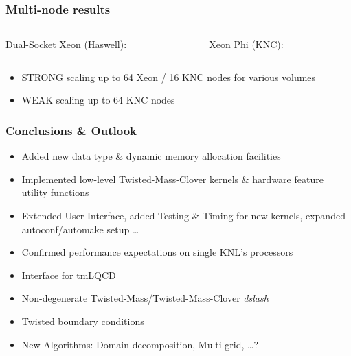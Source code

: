 \documentclass{beamer}
\begin{document}
  \begin{frame}
    \frametitle{Multi-node results}
    \footnotesize

    \begin{columns}[T]
      \begin{column}{.5\textwidth}
        \begin{center}
          Dual-Socket Xeon (Haswell):\\
          \vfill
        \end{center}
      \end{column}
      \begin{column}{.5\textwidth}
        \begin{center}
          Xeon Phi (KNC):\\
          \vfill
        \end{center}
      \end{column}
    \end{columns}

    \bigskip

    \begin{itemize}
      \item STRONG scaling up to 64 Xeon / 16 KNC nodes for various volumes
        \vfill
      \item WEAK scaling up to 64 KNC nodes
        \vfill
    \end{itemize}

  \end{frame}


  \begin{frame}
    \frametitle{Conclusions \& Outlook}

    \begin{itemize}
      \item Added new data type \& dynamic memory allocation facilities
      \item Implemented low-level Twisted-Mass-Clover kernels \& hardware feature utility functions
      \item Extended User Interface, added Testing \& Timing for new kernels,
        expanded autoconf/automake setup \dots
      \item Confirmed performance expectations on single KNL's processors
        \vspace{5mm}
        \pause
      \item Interface for tmLQCD
      \item Non-degenerate Twisted-Mass/Twisted-Mass-Clover \textit{dslash}
      \item Twisted boundary conditions
      \item New Algorithms: Domain decomposition, Multi-grid, \dots ?
        \vfill
    \end{itemize}
    \pause

  \end{frame}
\end{document}
